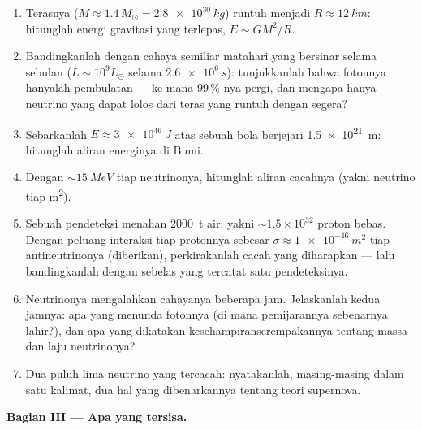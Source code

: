\begin{problem}
\begin{enumerate}[resume]
  \item Terasnya ($M \approx 1.4\,M_\odot = \qty{2.8e30}{kg}$)
        runtuh menjadi $R \approx \qty{12}{km}$: hitunglah
        energi gravitasi yang terlepas, $E \sim GM^2/R$.
  \item Bandingkanlah dengan cahaya semiliar matahari yang bersinar selama
        sebulan ($L \sim 10^{9}L_\odot$ selama $\qty{2.6e6}{s}$):
        tunjukkanlah bahwa fotonnya hanyalah pembulatan --- ke mana
        99\,\%-nya pergi, dan mengapa hanya neutrino yang dapat lolos dari
        teras yang runtuh dengan segera?
  \item Sebarkanlah $E \approx \qty{3e46}{J}$ atas sebuah bola berjejari
        \qty{1.5e21}{m}: hitunglah aliran energinya di
        Bumi.
  \item Dengan $\sim\qty{15}{MeV}$ tiap neutrinonya, hitunglah
        aliran cacahnya (yakni neutrino tiap \unit{m^2}).
  \item Sebuah pendeteksi menahan \qty{2000}{t} air:
        yakni ${\sim}1.5\times10^{32}$ proton bebas. Dengan peluang
        interaksi tiap protonnya sebesar
        $\sigma \approx \qty{1e-46}{m^2}$ tiap antineutrinonya
        (diberikan), perkirakanlah cacah yang diharapkan --- lalu bandingkanlah
        dengan sebelas yang tercatat satu pendeteksinya.
  \item Neutrinonya mengalahkan cahayanya beberapa jam. Jelaskanlah kedua
        jamnya: apa yang menunda fotonnya (di mana pemijarannya
        sebenarnya lahir?), dan apa yang dikatakan
        kesehampiranserempakannya tentang massa dan laju neutrinonya?
  \item Dua puluh lima neutrino yang tercacah: nyatakanlah, masing-masing dalam satu
        kalimat, dua hal yang dibenarkannya tentang teori supernova.
\end{enumerate}

\medskip\noindent\textbf{Bagian III --- Apa yang tersisa.}


\end{problem}
